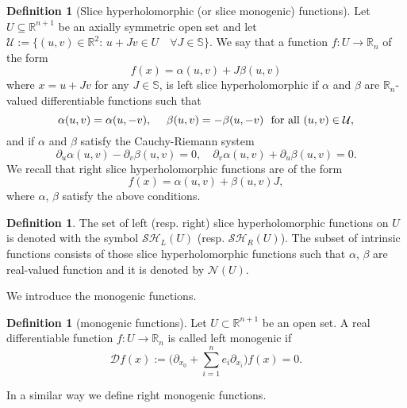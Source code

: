 \documentclass[reqno,11pt]{amsart}
\numberwithin{equation}{section}
\theoremstyle{definition}
\newtheorem{definition}[theorem]{Definition}
\newcommand{\rr}{\mathbb{R}}
\begin{document}
\begin{definition}[Slice hyperholomorphic (or slice monogenic) functions]
	\label{hyper}
	Let $U \subseteq \mathbb{R}^{n+1}$ be an axially symmetric open set and let $ \mathcal{U}:=\{(u,v)\in\rr^2:\, u+Jv\in U\quad\forall J\in\mathbb S\} $. We say that a function $f: U \to \mathbb{R}_n$ of the form
	\begin{equation}\label{slicefunc}
 f(x)=\alpha(u,v)+J\beta(u,v)
 \end{equation}
	where $x=u+Jv$ for any $J\in\mathbb S$, is left slice hyperholomorphic if $\alpha$ and $\beta$ are $ \mathbb{R}_n$-valued differentiable functions such that
	\begin{equation}\label{eveodd}
		\alpha(u,v)=\alpha(u,-v), \ \ \ \  \beta(u,v)=-\beta(u,-v) \ \\ \ \  \hbox{for all} \, \, (u,v) \in \mathcal{U},
	\end{equation}
	and if $\alpha$ and $\beta$ satisfy the Cauchy-Riemann system
	$$ \partial_u \alpha(u,v)- \partial_v \beta(u,v)=0, \quad \partial_v \alpha(u,v)+ \partial_u \beta(u,v)=0.$$
	We recall that right slice hyperholomorphic functions are of the form
	$$ f(x)= \alpha(u,v)+\beta(u,v)J,$$
	where $\alpha$, $\beta$ satisfy the above conditions.
\end{definition}
\begin{definition}
	The set of left (resp. right) slice hyperholomorphic functions on $U$ is denoted with the symbol $\mathcal{SH}_{L}(U)$ (resp. $\mathcal{SH}_{R}(U)$). The subset of intrinsic functions consists of those slice hyperholomorphic functions such that $\alpha$, $\beta$ are real-valued function and it is denoted by $ \mathcal{N}(U)$.
\end{definition}
We introduce the monogenic functions.
\begin{definition}[monogenic functions]\label{d2}
	Let $U\subset \mathbb R^{n+1}$ be an open set. A real differentiable function $ f: U \to \mathbb{R}_n$ is called left monogenic if
	$$\mathcal{D} f (x):=\big(\partial_{x_0} +\sum_{i=1}^n e_i
\partial_{x_i}\big)f(x)=0.
$$
\end{definition}
In a similar way we define right monogenic functions.
\end{document}
